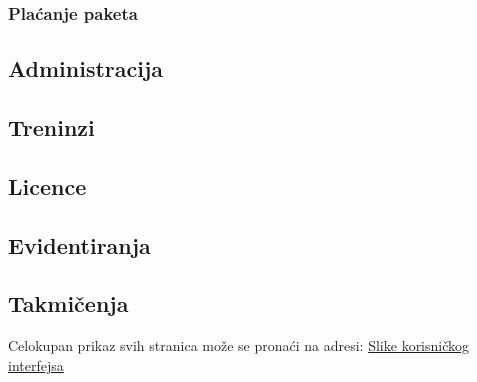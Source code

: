 \documentclass[../main.tex]{subfiles}
\begin{document}
\subsubsection{Plaćanje paketa}
\label{subsec:placanje}



\subsection{Administracija}


\subsection{Treninzi}


\subsection{Licence}


\subsection{Evidentiranja}



\subsection{Takmičenja}


Celokupan prikaz svih stranica može se pronaći na adresi: \href{https://github.com/jovanape/Informacioni-sistem-za-teretane/tree/main/screenshot-ovi_web_aplikacije}{Slike korisničkog interfejsa}
\end{document}
